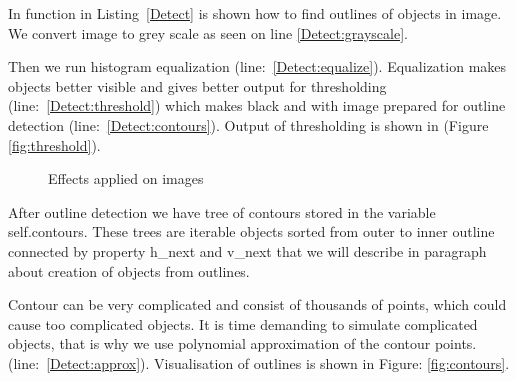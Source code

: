 \documentclass{ifacconf}
\begin{document}
In function in Listing~\ref{Detect} is shown how to find outlines of objects in
image. We convert image to grey scale as seen on line \ref{Detect:grayscale}.

Then we run histogram equalization (line:~\ref{Detect:equalize}). Equalization
makes objects better visible and gives better output for thresholding
(line:~\ref{Detect:threshold}) which makes black and with image prepared for
outline detection (line:~\ref{Detect:contours}). Output of thresholding is
shown in (Figure \ref{fig:threshold}).

\begin{figure}[h]
  \center
\caption{Effects applied on images}
\label{fig:operations}
\end{figure}

After outline detection we have tree of contours stored in the variable
self.contours. These trees are iterable objects sorted from outer to inner
outline connected by property h\_next and v\_next that we will describe in
paragraph about creation of objects from outlines.

Contour can be very complicated and consist of thousands of points, which could
cause too complicated objects. It is time demanding to simulate complicated
objects, that is why we use polynomial approximation of the contour points.
(line:~\ref{Detect:approx}). Visualisation of outlines is shown in Figure:
\ref{fig:contours}.
\end{document}
